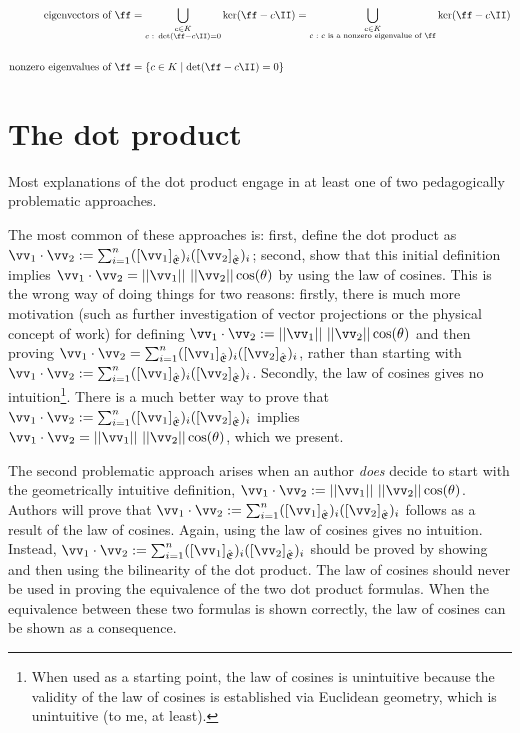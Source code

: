 \begin{deriv}
    \begin{align*}
        \text{eigenvectors of $\ff$} &=
        \bigcup_{\substack{c \in K \\ c \spc : \spc \det(\ff - c \II) = 0}} \ker(\ff - c \II) = 
        \bigcup_{\substack{c \in K \\ c \spc : \spc \text{$c$ is a nonzero eigenvalue of $\ff$}}} \ker(\ff - c \II)
        \\
        \quad
        \\
        \text{nonzero eigenvalues of $\ff$} &= \{ c \in K \mid \det(\ff - c \II) = 0 \}
    \end{align*}
    
\end{deriv}

\newpage

\section{The dot product}

Most explanations of the dot product engage in at least one of two pedagogically problematic approaches. 

The most common of these approaches is: first, define the dot product as $\vv_1 \cdot \vv_2 := \sum_{i = 1}^n ([\vv_1]_\sE)_i ([\vv_2]_\sE)_i$; second, show that this initial definition implies $\vv_1 \cdot \vv_2 = ||\vv_1|| \spc ||\vv_2|| \cos(\theta)$ by using the law of cosines. This is the wrong way of doing things for two reasons: firstly, there is much more motivation (such as further investigation of vector projections or the physical concept of work) for defining $\vv_1 \cdot \vv_2 := ||\vv_1|| \spc ||\vv_2|| \cos(\theta)$ and then proving $\vv_1 \cdot \vv_2 = \sum_{i = 1}^n ([\vv_1]_\sE)_i ([\vv_2]_\sE)_i$, rather than starting with $\vv_1 \cdot \vv_2 := \sum_{i = 1}^n ([\vv_1]_\sE)_i ([\vv_2]_\sE)_i$. Secondly, the law of cosines gives no intuition\footnote{When used as a starting point, the law of cosines is unintuitive because the validity of the law of cosines is established via Euclidean geometry, which is unintuitive (to me, at least).}. There is a much better way to prove that $\vv_1 \cdot \vv_2 := \sum_{i = 1}^n ([\vv_1]_\sE)_i ([\vv_2]_\sE)_i$ implies $\vv_1 \cdot \vv_2 = ||\vv_1|| \spc ||\vv_2|| \cos(\theta)$, which we present. 

The second problematic approach arises when an author \textit{does} decide to start with the geometrically intuitive definition, $\vv_1 \cdot \vv_2 := ||\vv_1|| \spc ||\vv_2|| \cos(\theta)$. Authors will prove that $\vv_1 \cdot \vv_2 := \sum_{i = 1}^n ([\vv_1]_\sE)_i ([\vv_2]_\sE)_i$ follows as a result of the law of cosines. Again, using the law of cosines gives no intuition. Instead, $\vv_1 \cdot \vv_2 := \sum_{i = 1}^n ([\vv_1]_\sE)_i ([\vv_2]_\sE)_i$ should be proved by showing and then using the bilinearity of the dot product. The law of cosines should never be used in proving the equivalence of the two dot product formulas. When the equivalence between these two formulas is shown correctly, the law of cosines can be shown as a consequence.

